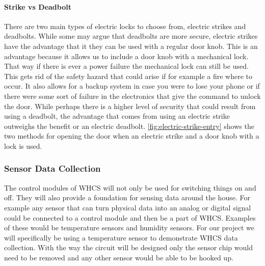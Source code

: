 \paragraph{Strike vs Deadbolt}
\label{sec:strike-v-deadbolt}
There are two main types of electric locks to choose from, electric strikes and
deadbolts. While some may argue that deadbolts are more secure, electric
strikes have the advantage that it they can be used with a regular door knob.
This is an advantage because it allows us to include a door knob with a
mechanical lock. That way if there is ever a power failure the mechanical lock
can still be used. This gets rid of the safety hazard that could arise if for
example a fire where to occur. It also allows for a backup system in case you
were to lose your phone or if there were some sort of failure in the
electronics that give the command to unlock the door. While perhaps there is a
higher level of security that could result from using a deadbolt, the advantage
that comes from using an electric strike outweighs the benefit or an electric
deadbolt. \autoref{fig:electric-strike-entry} shows the two methods for opening the door when
an electric strike and a door knob with a lock is used.


\subsubsection{Sensor Data Collection}
The control modules of WHCS will not only be used for switching things on and
off. They will also provide a foundation for sensing data around the house. For
example any sensor that can turn physical data into an analog or digital signal
could be connected to a control module and then be a part of WHCS. Examples of
these would be temperature sensors and humidity sensors. For our project we
will specifically be using a temperature sensor to demonstrate WHCS data
collection. With the way the circuit will be designed only the sensor chip
would need to be removed and any other sensor would be able to be hooked up.

